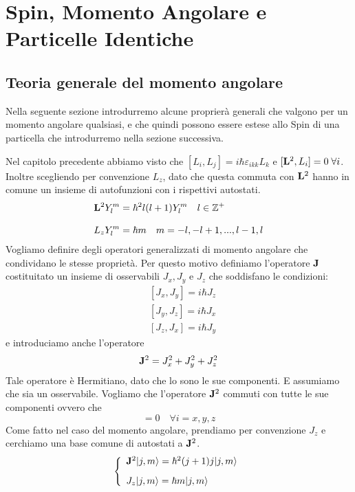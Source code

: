 \setcounter{chapter}{3}
\chapter{Spin, Momento Angolare e Particelle Identiche}

\section{Teoria generale del momento angolare}
Nella seguente sezione introdurremo alcune proprier\`a generali che valgono per un momento angolare qualsiasi, e che quindi possono essere estese allo Spin di una particella che introdurremo nella sezione successiva.
\newline

\noindent Nel capitolo precedente abbiamo visto che $[L_i,L_j] = i\hbar \varepsilon_{ikk}L_k$ e $[\bold{L}^2,L_i] = 0 \; \forall i$. Inoltre scegliendo per convenzione $L_z$, dato che questa commuta con $\bold{L}^2$ hanno in comune un insieme di autofunzioni con i rispettivi autostati.
\begin{align*}
	&\bold{L}^2Y_{l}^{m} = \hbar^2 l(l+1)Y_{l}^{m} \quad l \in \mathbb{Z}^+\\[0.3cm]
	&L_{z}Y_{l}^{m} = \hbar m \quad m=-l,-l+1,...,l-1,l
 \end{align*}
Vogliamo definire degli operatori generalizzati di momento angolare che condividano le stesse propriet\`a. Per questo motivo definiamo l'operatore $\bold{J}$ costituitato un insieme di osservabili $J_x,J_y$ e $J_z$ che soddisfano le condizioni: 
\begin{align*}
	& [J_x,J_y] = i\hbar J_z \\[0.3cm]
	& [J_y,J_z] = i \hbar J_x \\[0.3cm]
	& [J_z,J_x] = i \hbar J_y 
\end{align*}
e introduciamo anche l'operatore 
\begin{equation*}
	\bold{J}^2 = J_x^2 + J_y^2 +J_z^2
\end{equation*}
Tale operatore \`e Hermitiano, dato che lo sono le sue componenti. E assumiamo che sia un osservabile. Vogliamo che l'operatore $\bold{J}^2$ commuti con tutte le sue componenti ovvero che 
\begin{equation*}
	[\bold{J}^2,J_i] = 0 \quad \forall i=x,y,z
\end{equation*}
\newpage
Come fatto nel caso del momento angolare, prendiamo per convenzione $J_z$ e cerchiamo una base comune di autostati a $\bold{J}^2$.
\begin{equation*}
	\left \{ \begin{array}{l}
		\bold{J}^2|j,m \rangle = \hbar^2(j+1)j|j,m \rangle \\[0.3cm]
		J_z|j,m\rangle = \hbar m |j,m \rangle 
	\end{array}\right.
\end{equation*}

